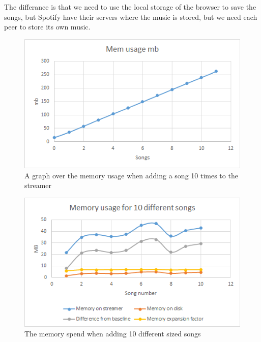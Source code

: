 The differance is that we need to use the local storage of the browser to save the songs, but Spotify have their servers where the music is stored, but we need each peer to store its own music.
\begin{figure}[H]
	\centering
	\includegraphics[scale=0.9]{gfx/memoryUsage}
	\caption{A graph over the memory usage when adding a song 10 times to the streamer}
	\label{fig:memoryUsage}
\end{figure}
\begin{figure}[H]
	\centering
	\includegraphics[scale=0.9]{gfx/memoryDiffSize}
	\caption{The memory spend when adding 10 different sized songs}
	\label{fig:memoryDiffSizes}
\end{figure}
